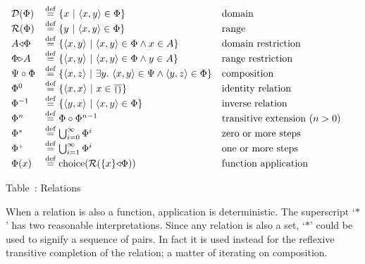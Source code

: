 $\begin{array}{lll}
{\cal D}(\Phi) &\eqldef \{x\ |\ \langle x,y\rangle \in \Phi\} & \mbox{domain}\\ 
{\cal R}(\Phi) &\eqldef \{y\ |\ \langle x,y\rangle \in \Phi\} & \mbox{range}\\ 
A\Dstrict\Phi &\eqldef \{\langle x,y\rangle\ 
   |\ \langle x,y\rangle \in \Phi \wedge x \in A\} & \mbox{domain restriction}\\ 
\Phi\Rstrict A &\eqldef \{\langle x,y\rangle\ 
   |\ \langle x,y\rangle \in \Phi \wedge y \in A\} & \mbox{range restriction}\\ 
\Psi \circ \Phi &\eqldef \{\langle x, z\rangle\ 
   |\ \exists y.\ \langle x, y\rangle
   \in \Psi \wedge \langle y, z\rangle \in \Phi\}
				& \mbox{composition}		\\
\Phi^0 &\eqldef \{\langle x, x\rangle\ |\ x \in \universe\} 
           & \mbox{identity relation}\\ 
\Phi^{-1} &\eqldef \{\langle y, x\rangle\ |\ \langle x, y\rangle\in\Phi\}
				& \mbox{inverse relation}		\\
\Phi^n &\eqldef \Phi \circ \Phi^{n-1} 
                                & \mbox{transitive extension ($n>0$)}\\
\Phi^* &\eqldef \bigcup_{i=0}^{\infty} \Phi^i 
                                & \mbox{zero or more steps}          \\
\Phi^{\scriptscriptstyle+} &\eqldef \bigcup_{i=1}^{\infty} \Phi^i
	                        & \mbox{one or more steps}           \\
\Phi(x) &\eqldef {\rm choice}({\cal R}(\{x\}\Dstrict \Phi))
	& \mbox{function application}
\end{array}
$

\begin{center}
Table~\thetable: Relations
\end{center}

When a relation is also a function, application is deterministic.  
The superscript `$*$' has two reasonable interpretations.  
Since any relation is also a set, `$*$' could be used to signify a 
sequence of pairs.  In fact it is used instead for the reflexive 
transitive completion of the relation; a matter of iterating on composition.

